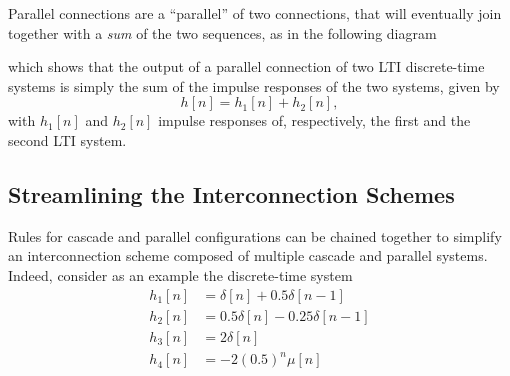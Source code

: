 \documentclass[\documentfontsize, twocolumn]{\classname}
\begin{document}
Parallel connections are a ``parallel'' of two connections, that will eventually join together with a \emph{sum} of the two sequences, as in the following diagram
\begin{center}
\end{center}
which shows that the output of a parallel connection of two LTI discrete-time systems is simply the sum of the impulse responses of the two systems, given by
\begin{equation}\label{eqn:parallelConnectionFormula}
    h[n] = h_1[n] + h_2[n],
\end{equation}
with $h_1[n]$ and $h_2[n]$ impulse responses of, respectively, the first and the second LTI system.

\subsection{Streamlining the Interconnection Sche\-mes}

Rules for cascade and parallel configurations can be chained together to simplify an interconnection scheme composed of multiple cascade and parallel systems. Indeed, consider as an example the discrete-time system
\begin{align*}
    h_1[n] &= \delta[n] + 0.5\delta[n-1]\\
    h_2[n] &= 0.5\delta[n] - 0.25\delta[n-1]\\
    h_3[n] &= 2\delta[n]\\
    h_4[n] &= -2(0.5)^n\mu[n]
\end{align*}
\end{document}
